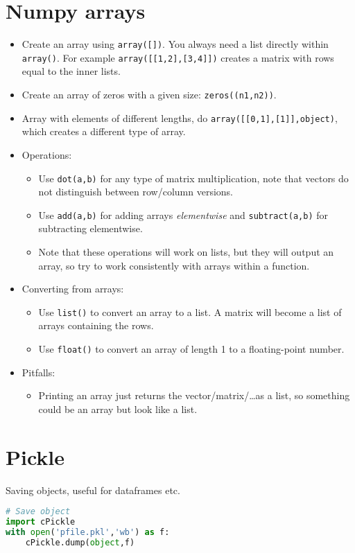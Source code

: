 \documentclass[11pt]{article}
\begin{document}
\begin{multicols*}{3}
\vspace{5pt}

\section{Numpy arrays }

\begin{itemize}[wide = 4pt, labelindent=\parindent]
\item Create an array using \verb+array([])+. You always need a list directly within \verb+array()+. For example \verb+array([[1,2],[3,4]])+ creates a matrix with rows equal to the inner lists. 
\item Create an array of zeros with a given size: \verb+zeros((n1,n2))+. 
\item Array with elements of different lengths, do \verb+array([[0,1],[1]],object)+, which creates a different type of array. 
\item Operations: 
  \begin{itemize}
  \item Use \verb+dot(a,b)+ for any type of matrix multiplication, note that vectors do not distinguish between row/column versions. 
  \item Use \verb+add(a,b)+ for adding arrays \textit{elementwise} and \verb+subtract(a,b)+ for subtracting elementwise. 
  \item Note that these operations will work on lists, but they will output an array, so try to work consistently with arrays within a function. 
  \end{itemize}
\item Converting from arrays:
  \begin{itemize}
  \item Use \verb+list()+ to convert an array to a list. A matrix will become a list of arrays containing the rows. 
  \item Use \verb+float()+ to convert an array of length 1 to a floating-point number.  
  \end{itemize}
\item Pitfalls:
  \begin{itemize}
  \item Printing an array just returns the vector/matrix/\ldots as a list, so something could be an array but look like a list. 
  \end{itemize}
\end{itemize}

\section{Pickle}
Saving objects, useful for dataframes etc.
\begin{lstlisting}[language=Python,linewidth=0.95\linewidth]
# Save object
import cPickle
with open('pfile.pkl','wb') as f:
    cPickle.dump(object,f)


\end{lstlisting}
\end{multicols*}
\end{document}

